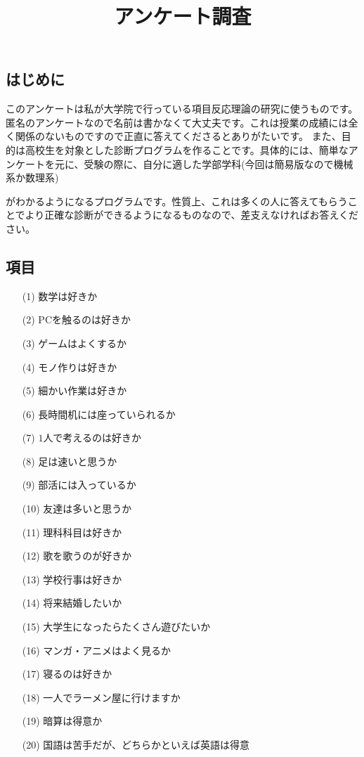 \documentclass[twocolumn, 20pt]{jarticle}
\title{アンケート調査}
\begin{document}
\columnseprule=0.2mm
\date{}
\maketitle
\subsection*{はじめに}
このアンケートは私が大学院で行っている項目反応理論の研究に使うものです。匿名のアンケートなので名前は書かなくて大丈夫です。これは授業の成績には全く関係のないものですので正直に答えてくださるとありがたいです。
また、目的は高校生を対象とした診断プログラムを作ることです。具体的には、簡単なアンケートを元に、受験の際に、自分に適した学部学科(今回は簡易版なので機械系か数理系)\rule[0mm]{0mm}{5mm}がわかるようになるプログラムです。性質上、これは多くの人に答えてもらうことでより正確な診断ができるようになるものなので、差支えなければお答えください。

\subsection*{項目}
\begin{itemize}
  \item[(1)]数学は好きか
  \item[(2)]PCを触るのは好きか
  \item[(3)]ゲームはよくするか
  \item[(4)]モノ作りは好きか
  \item[(5)]細かい作業は好きか
  \item[(6)]長時間机には座っていられるか
  \item[(7)]$1$人で考えるのは好きか
  \item[(8)]足は速いと思うか
  \item[(9)]部活には入っているか
  \item[(10)]友達は多いと思うか
  \item[(11)]理科科目は好きか
  \item[(12)]歌を歌うのが好きか
  \item[(13)]学校行事は好きか
  \item[(14)]将来結婚したいか
  \item[(15)]大学生になったらたくさん遊びたいか
  \item[(16)]マンガ・アニメはよく見るか
  \item[(17)]寝るのは好きか
  \item[(18)]一人でラーメン屋に行けますか
  \item[(19)]暗算は得意か
  \item[(20)]国語は苦手だが、どちらかといえば英語は得意
\end{itemize}
\end{document}
